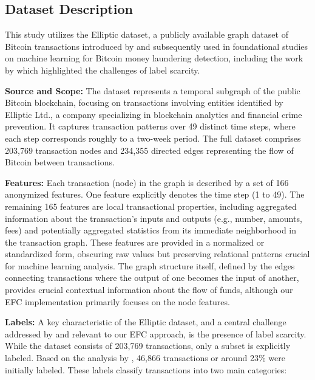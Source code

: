 \documentclass[12pt]{article}
\begin{document}
\subsection{Dataset Description} \label{subsec:dataset}

This study utilizes the Elliptic dataset, a publicly available graph dataset of Bitcoin transactions introduced by 
\cite{weber2019antimoneylaunderingbitcoinexperimenting} and subsequently used in foundational studies on machine
learning for Bitcoin money laundering detection, including the work by \cite{lorenz2021machinelearningmethodsdetect}
which highlighted the challenges of label scarcity.

\textbf{Source and Scope:} The dataset represents a temporal subgraph of the public Bitcoin blockchain, focusing on transactions
involving entities identified by Elliptic Ltd., a company specializing in blockchain analytics and financial crime prevention.
It captures transaction patterns over 49 distinct time steps, where each step corresponds roughly to a two-week period.
The full dataset comprises 203,769 transaction nodes and 234,355 directed edges representing the flow of Bitcoin between
transactions.

\textbf{Features:} Each transaction (node) in the graph is described by a set of 166 anonymized features. One feature
explicitly denotes the time step (1 to 49). The remaining 165 features are local transactional properties, including
aggregated information about the transaction's inputs and outputs (e.g., number, amounts, fees) and potentially aggregated
statistics from its immediate neighborhood in the transaction graph. These features are provided in a normalized or
standardized form, obscuring raw values but preserving relational patterns crucial for machine learning analysis. The
graph structure itself, defined by the edges connecting transactions where the output of one becomes the input of another,
provides crucial contextual information about the flow of funds, although our EFC implementation primarily focuses on the
node features.

\textbf{Labels:} A key characteristic of the Elliptic dataset, and a central challenge addressed by 
\cite{lorenz2021machinelearningmethodsdetect} and relevant to our EFC approach, is the presence of label scarcity. While
the dataset consists of 203,769 transactions, only a subset is explicitly labeled. Based on the analysis by 
\cite{weber2019antimoneylaunderingbitcoinexperimenting}, 46,866 transactions or around 23\% were initially labeled.
These labels classify transactions into two main categories:
\end{document}
